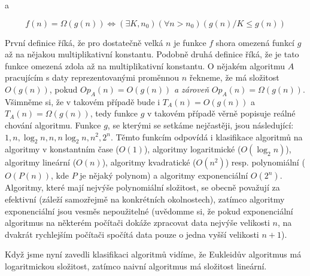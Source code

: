 a

\begin{displaymath}
 f(n) = \Omega(g(n)) \iff (\exists K,n_0)(\forall n>n_0)(g(n)/K\leq g(n))
\end{displaymath}

První definice říká, že pro dostatečně velká $n$ je funkce $f$ shora omezená funkcí $g$ až na nějakou multiplikativní konstantu. Podobně
druhá definice říká, že je tato funkce omezená zdola až na multiplikativní konstantu. O nějakém algoritmu $A$ pracujícím s daty reprezentovanými
proměnnou $n$ řekneme, že má složitost $O(g(n))$, pokud $Op_A(n) = O(g(n))$ \emph{a zároveň} $Op_A(n) = \Omega(g(n))$. Všimněme si, že v takovém
případě bude i $T_A(n) = O(g(n))$ a $T_A(n)=\Omega(g(n))$, tedy funkce $g$ v takovém případě věrně popisuje reálné chování algoritmu. Funkce $g$,
se kterými se setkáme nejčastěji, jsou následující: $1, n, \log_2 n, n, n\log_2 n, n^2, 2^n$. Těmto funkcím odpovídá i klasifikace algoritmů na
algoritmy v konstantním čase ($O(1)$), algoritmy logaritmické ($O(\log_2 n)$), algoritmy lineární ($O(n)$), algoritmy kvadratické ($O(n^2)$) resp.
polynomiální ($O(P(n))$, kde $P$ je nějaký polynom) a algoritmy exponenciální $O(2^n)$. Algoritmy, které mají nejvýše polynomiální složitost, se
obecně považují za efektivní (záleží samozřejmě na konkrétních okolnostech), zatímco algoritmy exponenciální jsou vesměs nepoužitelné (uvědomme si,
že pokud exponenciální algoritmus na některém počítači dokáže zpracovat data nejvýše velikosti $n$, na dvakrát rychlejším počítači spočítá data
pouze o jedna vyšší velikosti $n+1$).

Když jsme nyní zavedli klasifikaci algoritmů vidíme, že Eukleidův algoritmus má logaritmickou složitost, zatímco naivní algoritmus má složitost
lineární.

\ifx\ucebnice\undefined

\fi